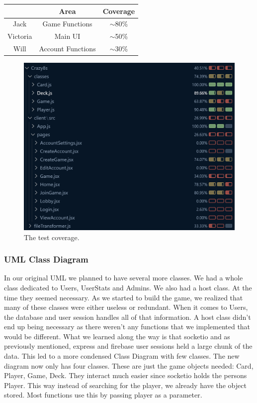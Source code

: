 \documentclass{article}
\begin{document}
\begin{table}[h]
\centering
\begin{tabular}{|c|c|c|}
\hline
\textbf{} & \textbf{Area}     & \textbf{Coverage} \\ \hline
Jack      & Game Functions    & $\sim$80\%        \\ \hline
Victoria  & Main UI           & $\sim$50\%        \\ \hline
Will      & Account Functions & $\sim$30\%        \\ \hline
\end{tabular}
\end{table}

\begin{figure}[h]
\centering
\includegraphics[width=\linewidth]{sprint3tests.png}
\caption{\label{fig:sprint3tests}The test coverage.}
\end{figure}

\subsubsection{UML Class Diagram}
In our original UML we planned to have several more classes. We had a whole class dedicated to Users, UserStats and Admins. We also had a host class. At the time they seemed necessary. As we started to build the game, we realized that many of these classes were either useless or redundant. When it comes to Users, the database and user session handles all of that information. A host class didn't end up being necessary as there weren't any functions that we implemented that would be different. What we learned along the way is that socketio and as previously mentioned, express and firebase user sessions held a large chunk of the data. This led to a more condensed Class Diagram with few classes. The new diagram now only has four classes. These are just the game objects needed: Card, Player, Game, Deck. They interact much easier since socketio holds the persons Player. This way instead of searching for the player, we already have the object stored. Most functions use this by passing player as a parameter.
\end{document}
